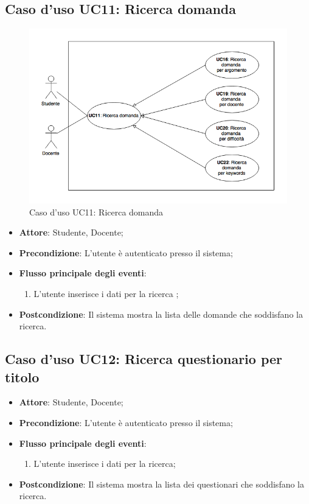 \documentclass[12pt,a4paper]{article}
\begin{document}
\subsection{Caso d'uso UC11: Ricerca domanda}
\begin{figure}[H]
	\centering
	\includegraphics[width=\textwidth]{diagramUC11.png}
	\caption{Caso d'uso UC11: Ricerca domanda}\label{fig:UC11} 
\end{figure}
\begin{itemize}

\item \textbf{Attore}: Studente, Docente; 
\item \textbf{Precondizione}: L'utente è autenticato presso il sistema;

\item \textbf{Flusso principale degli eventi}:
\begin{enumerate}
	\item L'utente inserisce i dati per la ricerca	;
	
\end{enumerate}
\item \textbf{Postcondizione}: Il sistema mostra la lista delle domande che soddisfano la ricerca.
\end{itemize}
\hypertarget{UC12}{}
\subsection{Caso d'uso UC12: Ricerca questionario per titolo}

\begin{itemize}

\item \textbf{Attore}: Studente, Docente; 
\item \textbf{Precondizione}: L'utente è autenticato presso il sistema;

\item \textbf{Flusso principale degli eventi}:
\begin{enumerate}
	\item L'utente inserisce i dati per la ricerca;
	
\end{enumerate}
\item \textbf{Postcondizione}: Il sistema mostra la lista dei questionari che soddisfano la ricerca.
\end{itemize}
\hypertarget{UC13}{}
\end{document}
